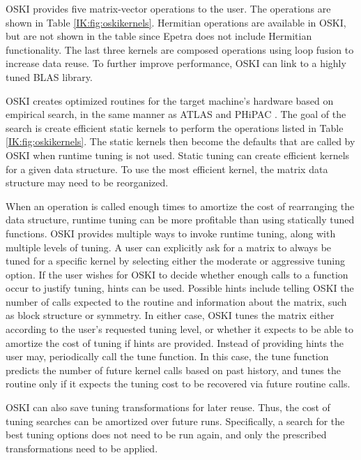OSKI provides five matrix-vector operations to the user.  The operations are
shown in Table \ref{IK:fig:oskikernels}.  Hermitian operations are available in OSKI,
but are not shown in the table since Epetra does not include Hermitian functionality.  The last three
kernels are composed operations using loop fusion \cite{IK:loopfussion} to increase data reuse.
To further improve performance, OSKI can link to a highly tuned BLAS library.

OSKI creates optimized routines for the target machine's hardware
based on empirical search, in the same manner as ATLAS \cite{IK:ATLAS} and PHiPAC \cite{IK:PHiPAC}.  The goal of the
search is create efficient static kernels to perform the operations listed in Table \ref{IK:fig:oskikernels}.
The static kernels then become the defaults that are called by OSKI when runtime
tuning is not used.  Static tuning can create efficient kernels for a
given data structure.
To use the most efficient kernel, the matrix data structure may need to be reorganized.

When an operation is called enough times to amortize the cost of rearranging the
data structure, runtime tuning can be more profitable than using statically tuned
functions.  OSKI provides multiple ways to invoke runtime tuning, along with multiple
levels of tuning.  A user can explicitly ask for a matrix to always be tuned for a specific
kernel by selecting either the moderate or aggressive tuning option.  If the user wishes for OSKI to 
decide whether enough calls to a function occur to justify tuning, hints can be used.
Possible hints include telling OSKI the number of calls expected to the routine and information
about the matrix, such as block structure or symmetry.  In either
case, OSKI tunes the matrix either according to the
user's requested tuning level, or whether it expects to be able to
amortize the cost of tuning if hints are provided.  Instead of providing hints the user may,
periodically call the tune function.  In this case, the tune function predicts
the number of future kernel calls based on past history, and tunes the routine only
if it expects the tuning cost to be recovered via future routine calls.

OSKI can also save tuning transformations for later reuse.  Thus, the cost of tuning searches can be
amortized over future runs.  Specifically, a search for the best tuning options does not need to be
run again, and only the prescribed transformations need to be applied.  

